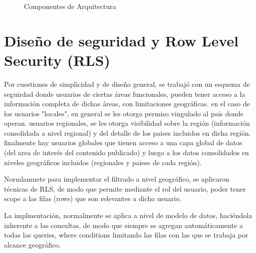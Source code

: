\begin{figure} [h!]
    \caption{Componentes de Arquitectura}
    \label{fig:arq_components2} 
\end{figure}

\newpage

\section{Diseño de seguridad y Row Level Security (RLS)}
Por cuestiones de simplicidad y de diseño general, se trabajó con un esquema de seguirdad donde usuarios de ciertas áreas funcionales, pueden tener acceso a la información completa de dichas áreas, con limitaciones geográficas. en el caso de los usuarios "locales", en general se les otorga permiso vingulado al país donde operan. usuarios regionales, se les otorga visibilidad sobre la región (información consolidada a nivel regional) y del detalle de los paises incluidos en dicha región.
finalmente hay usuarios globales que tienen acceso a una capa global de datos (del area de interés del contenido publicado) y luego a los datos consolidados en niveles geográficos incluidos (regionales y paiese de cada región).

Normlamnete para implementar el filtrado a nivel geográfico, se aplicaron técnicas de RLS, de modo que permite mediante el rol del usuario, poder tener scope a las filas (rows) que son relevantes a dicho usuario.

La implmentación, normalmente se aplica a nivel de modelo de datos, haciéndola inherente a las consultas, de modo que siempre se agregan automáticamente a todas las queries, where conditions limitando las filas con las que se trabaja por alcance geográfico.

